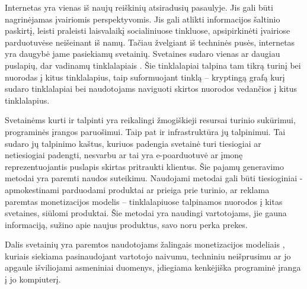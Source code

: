 Internetas yra vienas iš naujų reiškinių atsiradusių pasaulyje. Jis gali būti nagrinėjamas įvairiomis perspektyvomis. Jis gali atlikti informacijos šaltinio paskirtį, leisti praleisti laisvalaikį socialiniuose tinkluose, apsipirkinėti įvairiose parduotuvėse neišeinant iš namų.  Tačiau žvelgiant iš techninės pusės, internetas yra daugybė jame pasiekiamų svetainių. Svetaines sudaro vienas ar daugiau puslapių, dar vadinamų tinklalapiais . Šie tinklalapiai talpina tam tikrą turinį bei nuorodas į kitus tinklalapius, taip suformuojant tinklą -- kryptingą grafą kurį sudaro tinklalapiai bei naudotojams naviguoti skirtos nuorodos vedančios į kitus tinklalapius.

Svetainėms kurti ir talpinti yra reikalingi žmogiškieji resursai turinio sukūrimui, programinės įrangos paruošimui. Taip pat ir infrastruktūra jų talpinimui. Tai sudaro jų talpinimo kaštus, kuriuos padengia svetainė turi tiesiogiai ar netiesiogiai padengti, nesvarbu ar tai yra e-poarduotuvė ar įmonę reprezentuojantis puslapis skirtas pritraukti klientus. Šie pajamų generavimo metodai yra paremti naudos suteikimu. Naudojami metodai gali būti tiesioginiai - apmokestinami parduodami produktai ar prieiga prie turinio, ar reklama paremtas monetizacijos modelis -- tinklalapiuose talpinamos nuorodos į kitas svetaines, siūlomi produktai. Šie metodai yra naudingi vartotojams, jie gauna informaciją, sužino apie naujus produktus, savo noru perka prekes.

Dalis svetainių yra paremtos naudotojams žalingais monetizacijos modeliais \cite{tax}, kuriais siekiama pasinaudojant vartotojo naivumu, techniniu neišprusimu ar jo apgaule išviliojami asmeniniai duomenys, įdiegiama kenkėjiška programinė įranga į jo kompiuterį.